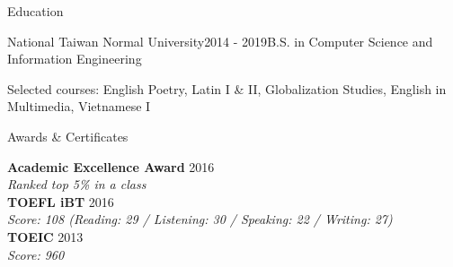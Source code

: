 \documentclass{resume} %
\begin{document}

\begin{rSection}{Education}

\begin{rSubsection}{National Taiwan Normal University}{2014 - 2019}{B.S. in Computer Science and Information Engineering}{}
\item Selected courses: English Poetry, Latin I \& II, Globalization Studies, English in Multimedia, Vietnamese I
\end{rSubsection}

\end{rSection}

\begin{rSection}{Awards \& Certificates}

	{\bf Academic Excellence Award} \hfill {2016} \\
	{\em Ranked top 5\% in a class} \\
	{\bf TOEFL iBT} \hfill {2016} \\
	{\em Score: 108 (Reading: 29 / Listening: 30 / Speaking: 22 / Writing: 27)} \\
	{\bf TOEIC} \hfill {2013} \\
	{\em Score: 960}

\end{rSection}
\end{document}

